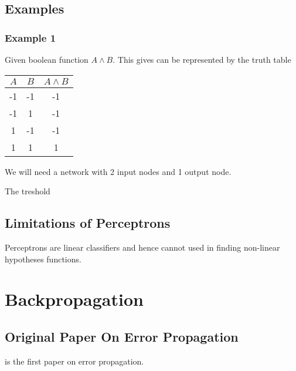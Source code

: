 \documentclass[10pt,a4paper]{article}
\begin{document}
\subsection{Examples}
\subsubsection{Example 1}

Given boolean function $A \wedge B$. This gives can be represented by the truth table

\begin{tabular}{|c|c|c|}
\hline
$A$ & $B$ & $A\wedge B$ \\
\hline
-1 & -1 & -1 \\
-1 & 1 & -1 \\
1 & -1 & -1 \\
1 & 1 & 1 \\
\hline
\end{tabular}

We will need a network with 2 input nodes and 1 output node. 

The treshold 
\subsection{Limitations of Perceptrons}

Perceptrons are linear classifiers and hence cannot used in finding non-linear hypotheses functions. 

\citep{Michell2009}
\section{Backpropagation}
\subsection{Original Paper On Error Propagation}
\cite{rumel} is the first paper on error propagation.
\end{document}
